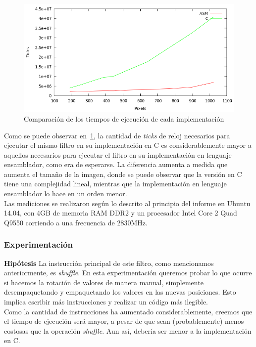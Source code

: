 \documentclass[a4paper]{article}
\begin{document}
\begin{figure}[H]
  \begin{center}
	\includegraphics[scale=0.77]{imagenes/rotarC.png}
	\caption{Comparación de los tiempos de ejecución de cada implementación}
	\label{rotar_asmvsc}
  \end{center}
\end{figure}

Como se puede observar en~\ref{rotar_asmvsc}, la cantidad de \textit{ticks} de reloj necesarios para ejecutar el mismo filtro en su implementación en C es considerablemente mayor a aquellos necesarios para ejecutar el filtro en su implementación en lenguaje ensamblador, como era de esperarse. La diferencia aumenta a medida que aumenta el tamaño de la imagen, donde se puede observar que la versión en C tiene una complejidad lineal, mientras que la implementación en lenguaje ensamblador lo hace en un orden menor.\\
Las mediciones se realizaron según lo descrito al principio del informe en Ubuntu 14.04, con 4GB de memoria RAM DDR2 y un procesador Intel Core 2 Quad Q9550 corriendo a una frecuencia de 2830MHz.

\subsubsection{Experimentación}
\textbf{Hipótesis}
\newline
La instrucción principal de este filtro, como mencionamos anteriormente, es \textit{shuffle}. En esta experimentación queremos probar lo que ocurre si hacemos la rotación de valores de manera manual, simplemente desempaquetando y empaquetando los valores en las nuevas posiciones. Esto implica escribir más instrucciones y realizar un código más ilegible.
\\Como la cantidad de instrucciones ha aumentado considerablemente, creemos que el tiempo de ejecución será mayor, a pesar de que sean (probablemente) menos costosas que la operación \textit{shuffle}. Aun así, debería ser menor a la implementación en C. 
\newline
\end{document}
